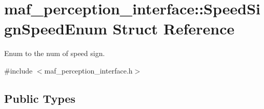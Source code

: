 \hypertarget{structmaf__perception__interface_1_1SpeedSignSpeedEnum}{}\section{maf\+\_\+perception\+\_\+interface\+:\+:Speed\+Sign\+Speed\+Enum Struct Reference}
\label{structmaf__perception__interface_1_1SpeedSignSpeedEnum}


Enum to the num of speed sign.  




{\ttfamily \#include $<$maf\+\_\+perception\+\_\+interface.\+h$>$}

\subsection*{Public Types}
